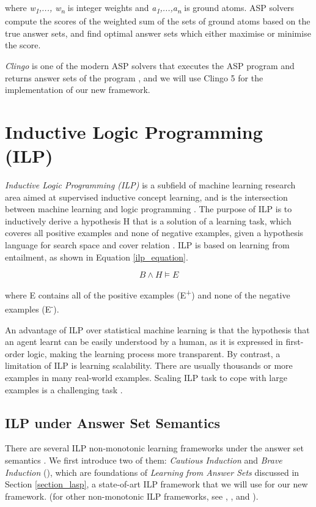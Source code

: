 \documentclass[12pt,twoside]{report}
\theoremstyle{plain}
\theoremstyle{definition}
\begin{document}
where \textit{w\textsubscript{1},..., w\textsubscript{n}} is integer weights and \textit{a\textsubscript{1},...,a\textsubscript{n}} is ground atoms.  ASP solvers compute the scores of the weighted sum of the sets of ground atoms based on the true answer sets, and find optimal answer sets which either maximise or minimise the score.

\textit{Clingo} is one of the modern ASP solvers that executes the ASP program and returns answer sets of the program \cite{Gebser2011}, and we will use Clingo 5 for the implementation of our new framework.


\section{Inductive Logic Programming (ILP)}
\label{sec:ilp}

\textit{Inductive Logic Programming (ILP)} is a subfield of machine learning research area aimed at supervised inductive concept learning, and is the intersection between machine learning and logic programming \cite{Muggleton1991}. The purpose of ILP is to inductively derive a hypothesis H that is a solution of a learning task, which coveres all positive examples and none of negative examples, given a hypothesis language for search space and cover relation \cite{DeRaedt1997}. ILP is based on learning from entailment, as shown in Equation \ref{ilp_equation}.

\begin{equation}
B \wedge H \models E
\end{equation}
\label{ilp_equation}

where E contains all of the positive examples (E\textsuperscript{+}) and none of the negative examples (E\textsuperscript{-}).

An advantage of ILP over statistical machine learning is that the hypothesis that an agent learnt can be easily understood by a human, as it is expressed in first-order logic, making the learning process more transparent.
By contrast, a limitation of ILP is learning scalability. There are usually thousands or more examples in many real-world examples. Scaling ILP task to cope with large examples is a challenging task \cite{Muggleton1993}.

\subsection{ILP under Answer Set Semantics}
There are several ILP non-monotonic learning frameworks under the answer set semantics . We first introduce two of them: \textit{Cautious Induction} and \textit{Brave Induction} (\cite{Sakama2009}), which are foundations of \textit{Learning from Answer Sets} discussed in Section \ref{section_lasp}, a state-of-art ILP framework that we will use for our new framework.  (for other non-monotonic ILP frameworks, see \cite{Otero2001}, \cite{Inoue2014}, \cite{Corapi2012} and \cite{DeRaedt1997}).
\end{document}
